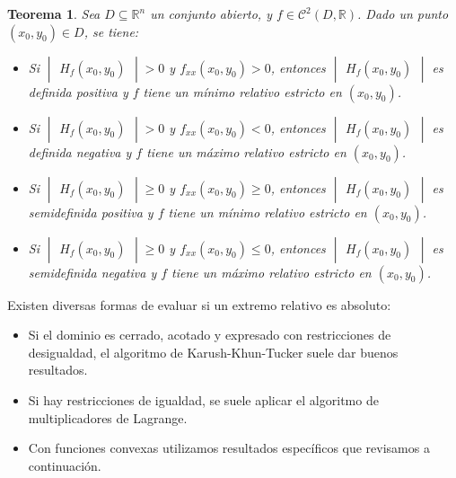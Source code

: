 \documentclass[a4paper,11pt]{article}
\newtheorem{theorem}{Teorema}
\begin{document}
\begin{theorem}
Sea $D\subseteq \mathbb{R}^n$ un conjunto abierto, y $f\in\mathcal{C}^2(D,\mathbb{R})$. Dado un punto $(x_0,y_0)\in D$, se tiene:
\begin{itemize}
    \item Si $\begin{vmatrix}H_f(x_0,y_0)\end{vmatrix}>0$ y $ f_{xx}(x_0,y_0)>0$, entonces $\begin{vmatrix}H_f(x_0,y_0)\end{vmatrix}$ es definida positiva
y $f$ tiene un mínimo relativo estricto en $(x_0, y_0)$.
    \item Si $\begin{vmatrix}H_f(x_0,y_0)\end{vmatrix}>0$ y $ f_{xx}(x_0,y_0)<0$, entonces $\begin{vmatrix}H_f(x_0,y_0)\end{vmatrix}$ es definida negativa
y $f$ tiene un máximo relativo estricto en $(x_0, y_0)$.
    \item Si $\begin{vmatrix}H_f(x_0,y_0)\end{vmatrix}\geq0$ y $ f_{xx}(x_0,y_0)\geq0$, entonces $\begin{vmatrix}H_f(x_0,y_0)\end{vmatrix}$ es semidefinida positiva
y $f$ tiene un mínimo relativo estricto en $(x_0, y_0)$.
  \item Si $\begin{vmatrix}H_f(x_0,y_0)\end{vmatrix}\geq0$ y $ f_{xx}(x_0,y_0)\leq0$, entonces $\begin{vmatrix}H_f(x_0,y_0)\end{vmatrix}$ es semidefinida negativa 
y $f$ tiene un máximo relativo estricto en $(x_0, y_0)$.
\end{itemize}

\end{theorem}
\noindent
Existen diversas formas de evaluar si un extremo relativo es absoluto:

\begin{itemize}
\item Si el dominio es cerrado, acotado y expresado con restricciones de desigualdad, el algoritmo de Karush-Khun-Tucker suele dar buenos resultados.
\item Si hay restricciones de igualdad, se suele aplicar el algoritmo de multiplicadores de Lagrange.
\item Con funciones convexas utilizamos resultados específicos que revisamos a
continuación.

\end{itemize}
\end{document}
